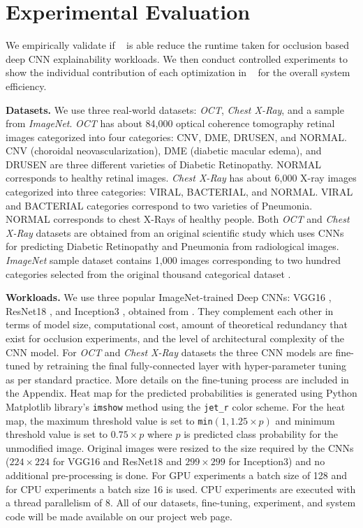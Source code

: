 \section{Experimental Evaluation}
We empirically validate if \system~ is able reduce the runtime taken for occlusion based deep CNN explainability workloads.
We then conduct controlled experiments to show the individual contribution of each optimization in \system~ for the overall system efficiency.

\vspace{2mm}
\noindent \textbf{Datasets.}
We use three real-world datasets: \textit{OCT}, \textit{Chest X-Ray}, and a sample from \textit{ImageNet}. \textit{OCT} has about 84,000 optical coherence tomography retinal images categorized into four categories: CNV, DME, DRUSEN, and NORMAL. CNV (choroidal neovascularization), DME (diabetic macular edema), and DRUSEN are three different varieties of Diabetic Retinopathy. NORMAL corresponds to healthy retinal images. \textit{Chest X-Ray} has about 6,000 X-ray images categorized into three categories: VIRAL, BACTERIAL, and NORMAL.
VIRAL and BACTERIAL categories correspond to two varieties of Pneumonia. NORMAL corresponds to chest X-Rays of healthy people. Both \textit{OCT} and \textit{Chest X-Ray} datasets are obtained from an original scientific study \cite{kermany2018identifying} which uses CNNs for predicting Diabetic Retinopathy and Pneumonia from radiological images. \textit{ImageNet} sample dataset contains 1,000 images corresponding to two hundred categories selected from the original thousand categorical dataset \cite{deng2009imagenet}.

\vspace{2mm}
\noindent \textbf{Workloads.}
We use three popular ImageNet-trained Deep CNNs: VGG16 \cite{vggnet}, ResNet18 \cite{resnet}, and Inception3 \cite{inception}, obtained from \cite{torchvisionmodels}.
They complement each other in terms of model size, computational cost, amount of theoretical redundancy that exist for occlusion experiments, and the level of architectural complexity of the CNN model.
For \textit{OCT} and \textit{Chest X-Ray} datasets the three CNN models are fine-tuned by retraining the final fully-connected layer with hyper-parameter tuning as per standard practice.
More details on the fine-tuning process are included in the Appendix.
Heat map for the predicted probabilities is generated using Python Matplotlib library's \texttt{imshow} method using the \texttt{jet\_r} color scheme.
For the heat map, the maximum threshold value is set to \texttt{min}$(1, 1.25 \times p)$ and minimum threshold value is set to $0.75 \times p$ where $p$ is predicted class probability for the unmodified image.
Original images were resized to the size required by the CNNs ($224\times224$ for VGG16 and ResNet18 and $299\times299$ for Inception3) and no additional pre-processing is done.
For GPU experiments a batch size of 128 and for CPU experiments a batch size 16 is used.
CPU experiments are executed with a thread parallelism of 8.
All of our datasets, fine-tuning, experiment, and system code will be made available on our project web page.

